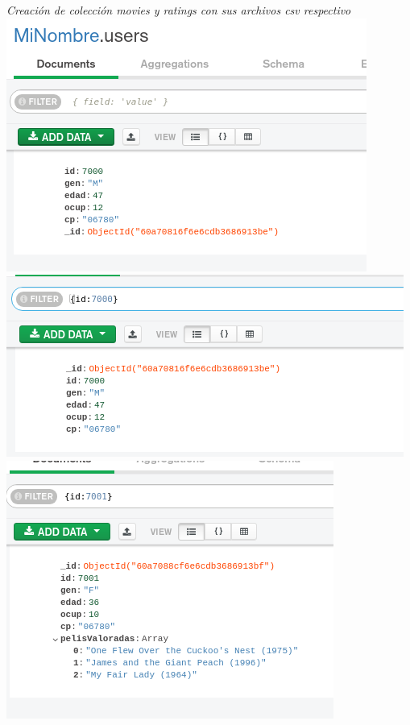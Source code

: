 \documentclass[10pt]{article}
\begin{document}
\begin{center}
  \textit{Creación de colección movies y ratings con sus archivos csv respectivo}\\
  \includegraphics[scale=0.25]{imgs/14.png}\\
  \includegraphics[scale=0.25]{imgs/15.png}\\
  \includegraphics[scale=0.25]{imgs/16.png}\\

\end{center}
\end{document}
